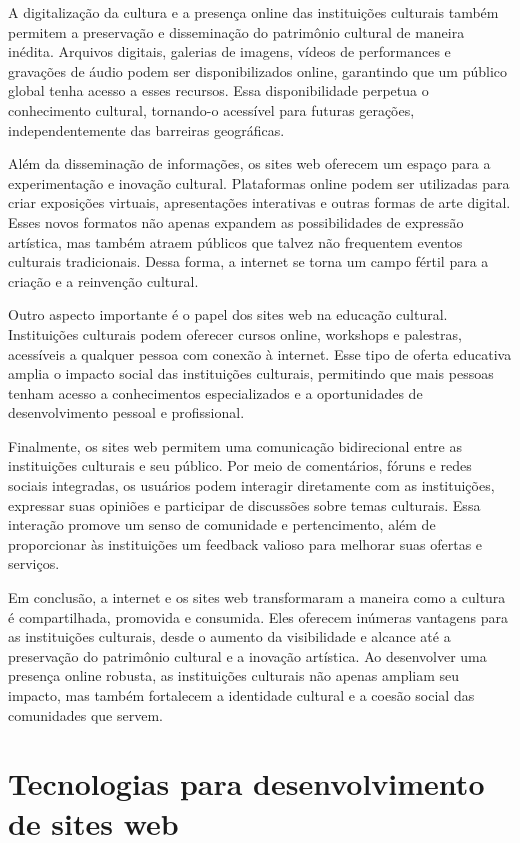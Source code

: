 A digitalização da cultura e a presença online das instituições culturais também permitem a preservação e disseminação do patrimônio cultural de maneira inédita. Arquivos digitais, galerias de imagens, vídeos de performances e gravações de áudio podem ser disponibilizados online, garantindo que um público global tenha acesso a esses recursos. Essa disponibilidade perpetua o conhecimento cultural, tornando-o acessível para futuras gerações, independentemente das barreiras geográficas.

Além da disseminação de informações, os sites web oferecem um espaço para a experimentação e inovação cultural. Plataformas online podem ser utilizadas para criar exposições virtuais, apresentações interativas e outras formas de arte digital. Esses novos formatos não apenas expandem as possibilidades de expressão artística, mas também atraem públicos que talvez não frequentem eventos culturais tradicionais. Dessa forma, a internet se torna um campo fértil para a criação e a reinvenção cultural.

Outro aspecto importante é o papel dos sites web na educação cultural. Instituições culturais podem oferecer cursos online, workshops e palestras, acessíveis a qualquer pessoa com conexão à internet. Esse tipo de oferta educativa amplia o impacto social das instituições culturais, permitindo que mais pessoas tenham acesso a conhecimentos especializados e a oportunidades de desenvolvimento pessoal e profissional.

Finalmente, os sites web permitem uma comunicação bidirecional entre as instituições culturais e seu público. Por meio de comentários, fóruns e redes sociais integradas, os usuários podem interagir diretamente com as instituições, expressar suas opiniões e participar de discussões sobre temas culturais. Essa interação promove um senso de comunidade e pertencimento, além de proporcionar às instituições um feedback valioso para melhorar suas ofertas e serviços.

Em conclusão, a internet e os sites web transformaram a maneira como a cultura é compartilhada, promovida e consumida. Eles oferecem inúmeras vantagens para as instituições culturais, desde o aumento da visibilidade e alcance até a preservação do patrimônio cultural e a inovação artística. Ao desenvolver uma presença online robusta, as instituições culturais não apenas ampliam seu impacto, mas também fortalecem a identidade cultural e a coesão social das comunidades que servem.

\section{Tecnologias para desenvolvimento de sites web}

